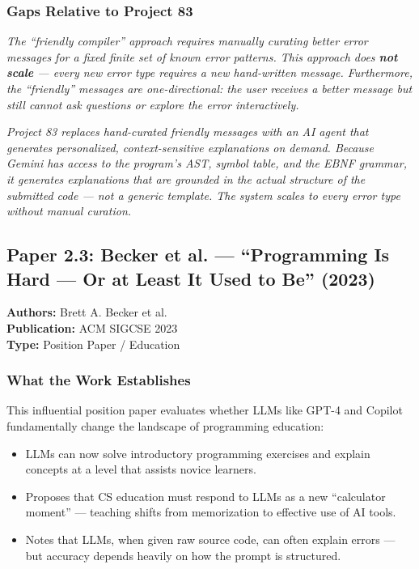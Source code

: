 \documentclass[a4paper,11pt]{article}
\newcommand{\papergap}[1]{%
  \begin{tcolorbox}[colback=red!5!white, colframe=red!60!black, title={Research Gap Identified}]
  \textit{#1}
  \end{tcolorbox}
}
\newcommand{\oursolution}[1]{%
  \begin{tcolorbox}[colback=green!5!white, colframe=green!60!black, title={How Project 83 Solves This Gap}]
  \textit{#1}
  \end{tcolorbox}
}
\begin{document}
\subsubsection{Gaps Relative to Project 83}

\papergap{The ``friendly compiler'' approach requires \textit{manually curating} better error messages for a fixed finite set of known error patterns. This approach does \textbf{not scale} --- every new error type requires a new hand-written message. Furthermore, the ``friendly'' messages are one-directional: the user receives a better message but still cannot ask questions or explore the error interactively.}

\oursolution{Project 83 replaces hand-curated friendly messages with an AI agent that generates \textit{personalized, context-sensitive} explanations on demand. Because Gemini has access to the program's AST, symbol table, and the EBNF grammar, it generates explanations that are grounded in the actual structure of the submitted code --- not a generic template. The system scales to every error type without manual curation.}

\subsection{Paper 2.3: Becker et al. --- ``Programming Is Hard --- Or at Least It Used to Be'' (2023)}

\begin{tcolorbox}[colback=gray!5, colframe=gray!40]
\textbf{Authors:} Brett A. Becker et al. \\
\textbf{Publication:} ACM SIGCSE 2023 \\
\textbf{Type:} Position Paper / Education
\end{tcolorbox}

\subsubsection{What the Work Establishes}

This influential position paper evaluates whether LLMs like GPT-4 and Copilot fundamentally change the landscape of programming education:
\begin{itemize}
    \item LLMs can now solve introductory programming exercises and explain concepts at a level that assists novice learners.
    \item Proposes that CS education must respond to LLMs as a new ``calculator moment'' --- teaching shifts from memorization to effective use of AI tools.
    \item Notes that LLMs, when given raw source code, can often explain errors --- but accuracy depends heavily on how the prompt is structured.
\end{itemize}
\end{document}
